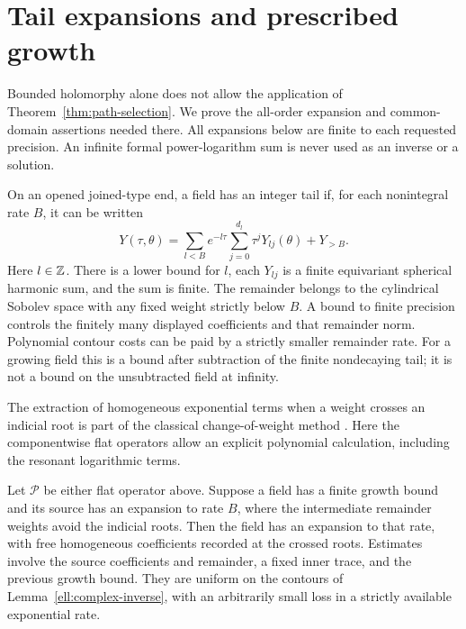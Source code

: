 \section{Tail expansions and prescribed growth}
\label{ell:tail-calculus}

Bounded holomorphy alone does not allow the application of
Theorem~\ref{thm:path-selection}.  We prove the all-order expansion
and common-domain assertions needed there.  All expansions below
are finite to each requested precision.  An infinite formal
power-logarithm sum is never used as an inverse or a solution.

\begin{definition}
\label{ell:tail-definition}
On an opened joined-type end, a field has an integer tail if, for
each nonintegral rate $B$, it can be written
\begin{equation}
 Y(\tau,\theta)=
 \sum_{l<B}e^{-l\tau}\sum_{j=0}^{d_l}\tau^jY_{lj}(\theta)
       +Y_{>B}.
 \label{ell:tail-series}
\end{equation}
Here $l\in\mathbb{Z}$.  There is a lower bound for $l$, each $Y_{lj}$ is a finite
equivariant spherical harmonic sum, and the sum is finite.
The remainder belongs to the cylindrical Sobolev space with any
fixed weight strictly below $B$.  A bound to finite precision
controls the finitely many displayed coefficients and that
remainder norm.  Polynomial contour costs can be paid by a
strictly smaller remainder rate.  For a growing field this is
a bound after subtraction of the finite nondecaying tail; it is
not a bound on the unsubtracted field at infinity.
\end{definition}

The extraction of homogeneous exponential terms when a weight crosses
an indicial root is part of the classical change-of-weight method
\cite[Section~5]{LockhartMcOwen1985}. Here the componentwise flat
operators allow an explicit polynomial calculation, including the
resonant logarithmic terms.

\begin{lemma}
\label{ell:flat-tail}
Let $\mathcal P$ be either flat operator above.  Suppose a field
has a finite growth bound and its source has an expansion to
rate $B$, where the intermediate remainder weights avoid the
indicial roots.  Then the field has an expansion to that rate,
with free homogeneous coefficients recorded at the crossed
roots.  Estimates involve the source coefficients and remainder,
a fixed inner trace, and the previous growth bound.  They are
uniform on the contours of Lemma~\ref{ell:complex-inverse}, with
an arbitrarily small loss in a strictly available exponential
rate.
\end{lemma}

